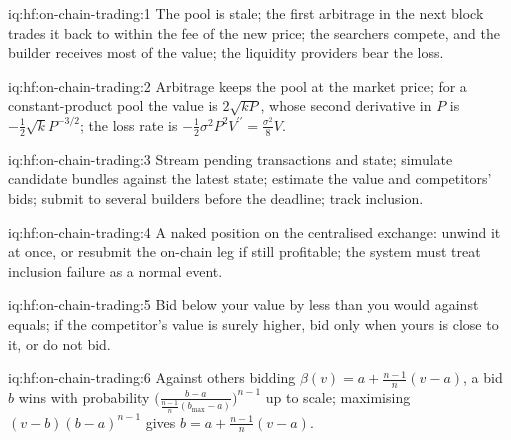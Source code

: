 \begin{solution}{iq:hf:on-chain-trading:1}
The pool is stale; the first arbitrage in the next block trades it back to within the fee of the new price; the searchers compete, and the builder
receives most of the value; the liquidity providers bear the loss.
\end{solution}

\begin{solution}{iq:hf:on-chain-trading:2}
Arbitrage keeps the pool at the market price; for a constant-product pool the value is $2\sqrt{kP}$, whose second derivative in $P$ is
$-\frac12\sqrt k P^{-3/2}$; the loss rate is $-\frac12\sigma^2P^2V^{\prime\prime}=\frac{\sigma^2}{8}V$.
\end{solution}

\begin{solution}{iq:hf:on-chain-trading:3}
Stream pending transactions and state; simulate candidate bundles against the latest state; estimate the value and competitors' bids; submit to
several builders before the deadline; track inclusion.
\end{solution}

\begin{solution}{iq:hf:on-chain-trading:4}
A naked position on the centralised exchange: unwind it at once, or resubmit the on-chain leg if still profitable; the system must treat inclusion
failure as a normal event.
\end{solution}

\begin{solution}{iq:hf:on-chain-trading:5}
Bid below your value by less than you would against equals; if the competitor's value is surely higher, bid only when yours is close to it, or do
not bid.
\end{solution}

\begin{solution}{iq:hf:on-chain-trading:6}
Against others bidding $\beta(v)=a+\frac{n-1}{n}(v-a)$, a bid $b$ wins with probability $\bigl(\frac{b-a}{\frac{n-1}{n}(b_{\max}-a)}\bigr)^{n-1}$
up to scale; maximising $(v-b)(b-a)^{n-1}$ gives $b=a+\frac{n-1}{n}(v-a)$.
\end{solution}
